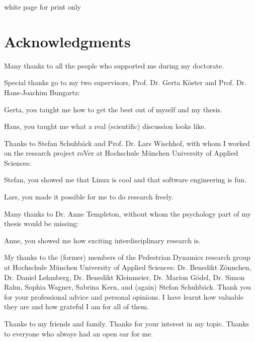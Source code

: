 \documentclass[
							a4paper, 
							11pt, 
							openany, 
							bibtotoc, 
							parskip=half, 
   							headings=normal,
   							bibliography=totoc
						]{scrreprt}
\begin{document}
\newpage

{\color{white} white page for print only}

\newpage




\section*{\centering Acknowledgments}


Many thanks to all the people who supported me during my doctorate. 

Special thanks go to my two supervisors, Prof. Dr. Gerta Köster and Prof. Dr. Hans-Joachim Bungartz:

\hspace{0.5cm} Gerta, you taught me how to get the best out of myself and my thesis.

\hspace{0.5cm} Hans, you taught me what a real (scientific) discussion looks like.

Thanks to Stefan Schuhbäck and Prof. Dr. Lars Wischhof, with whom I worked on the research project roVer at Hochschule München University of Applied Sciences:

\hspace{0.5cm} Stefan, you showed me that Linux is cool and that software engineering is fun.

\hspace{0.5cm} Lars, you made it possible for me to do research freely. 

Many thanks to Dr. Anne Templeton, without whom the psychology part of my thesis would be missing:

\hspace{0.5cm} Anne, you showed me how exciting interdisciplinary research is. 


My thanks to the (former) members of the Pedestrian Dynamics research group at Hochschule München University of Applied Sciences: Dr. Benedikt Zönnchen, Dr. Daniel Lehmberg, Dr. Benedikt Kleinmeier, Dr. Marion Gödel, Dr. Simon Rahn, Sophia Wagner, Sabrina Kern, and (again) Stefan Schuhbäck. Thank you for your professional advice and personal opinions. I have learnt how valuable they are and how grateful I am for all of them.



Thanks to my friends and family. Thanks for your interest in my topic. Thanks to everyone who always had an open ear for me. 
\end{document}
